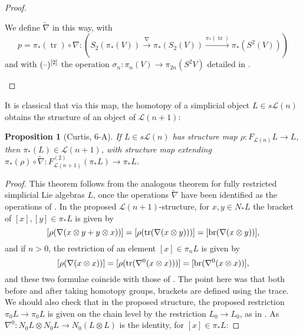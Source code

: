 \documentclass[11pt]{amsart}
\theoremstyle{plain}
\newtheorem{prop}[thm]{Proposition}
\theoremstyle{definition}
\DeclareMathOperator{\trace}{tr}
\newcommand{\DASH}{\textup{--}}
\renewcommand{\to}{\longrightarrow}
\newcommand{\calL}{\mathcal{L}}
\theoremstyle{plain}
\newcommand{\restn}[1]{#1^{[2]}}
\newcommand{\F}{\mathbb{F}}
\begin{document}
\begin{Lie algebras in characteristic 2 and their homotopy operations}
\begin{proof}
\begin{shaded}
We define $\widetilde{\nabla}$ in this way, with
\[p=\pi_*(\trace)\circ\nabla:\left(S_2(\pi_*(V))\overset{\nabla}{\to}\pi_*(S_2(V))\overset{\pi_*(\trace)}{\to}\pi_*(S^2(V))\right)\]
and with $\restn{(\DASH)}$ the operation $\sigma_n:\pi_n(V)\to \pi_{2n}(S^2V)$ detailed in \cite[\S3]{MR1089001}.
\end{shaded}
%
\end{proof}
It is classical that via this map, the homotopy of a simplicial object $L\in s\calL(n)$ obtains the structure of an object of $\calL(n+1)$:
\begin{prop}[Curtis, 6-A]\label{prop on top operations}
If $L\in s\calL(n)$ has structure map $\rho:F_{\calL(n)}L\to L$, then $\pi_*(L)\in\calL(n+1)$, with structure map extending $\pi_*(\rho)\circ\widetilde{\nabla}:F^{(2)}_{\calL(n+1)}(\pi_*L)\to \pi_*L$.
\end{prop}
\begin{proof}
This theorem follows from the analogous theorem for fully restricted simplicial Lie algebras $L$, once the operations $\widetilde{\nabla}$ have been identified as the operations of \cite[\S8.5]{CurtisSimplicialHtpy.pdf}. In the proposed $\calL(n+1)$-structure, for $x,y
\in N_*L$ the bracket of $[x],[y]\in\pi_*L$ is given by
\[[\rho(\nabla(x\otimes y+y\otimes x))]=[\rho(\trace(\nabla(x\otimes y)))]=[\textup{br}(\nabla(x\otimes y))],\]
and if $n>0$, the restriction of an element $[x]\in\pi_nL$ is given by
\[[\rho(\nabla(x\otimes x))]=[\rho(\trace(\nabla^0(x\otimes x)))]=[\textup{br}(\nabla^0(x\otimes x))],\]
and these two formulae coincide with those of \cite{CurtisSimplicialHtpy.pdf}. The point here was that both before and after taking homotopy groups, brackets are defined using the trace. We should also check that in the proposed structure, the proposed restriction $\pi_0L\to \pi_0L$ is given on the chain level by the restriction $L_0\to L_0$, as in \cite{CurtisSimplicialHtpy.pdf}. As $\nabla^0:N_0L\otimes N_0L\to N_0(L\otimes L)$ is the identity, for $[x]\in\pi_*L$:

\end{proof}
\end{Lie algebras in characteristic 2 and their homotopy operations}
\end{document}
